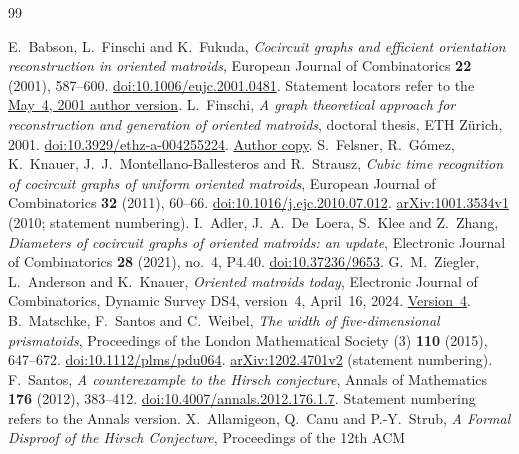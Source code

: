 \documentclass[11pt]{article}
\theoremstyle{remark}
\begin{document}
\begin{thebibliography}{99}
\footnotesize\raggedright
\setlength{\baselineskip}{10pt}
\setlength{\itemsep}{0pt}
E.~Babson, L.~Finschi and K.~Fukuda,
\emph{Cocircuit graphs and efficient orientation reconstruction in oriented
matroids}, European Journal of Combinatorics \textbf{22} (2001), 587--600.
\href{https://doi.org/10.1006/eujc.2001.0481}{doi:10.1006/eujc.2001.0481}.
Statement locators refer to the \href{https://finschi.com/math/publ/2001-05-04_Babson-Finschi-Fukuda_Cocircuit-Graphs-Orientation-Reconstruction.pdf}{May~4, 2001 author version}.
L.~Finschi, \emph{A graph theoretical approach for reconstruction and
generation of oriented matroids}, doctoral thesis, ETH Z\"urich, 2001.
\href{https://doi.org/10.3929/ethz-a-004255224}{doi:10.3929/ethz-a-004255224}.
\href{https://finschi.com/math/publ/2001-08-31_Finschi_A-Graph-Theoretical-Approach-for-Reconstruction-and-Generation-of-Oriented-Matroids.pdf}{Author copy}.
S.~Felsner, R.~G\'omez, K.~Knauer, J.~J.~Montellano-Ballesteros and R.~Strausz,
\emph{Cubic time recognition of cocircuit graphs of uniform oriented matroids},
European Journal of Combinatorics \textbf{32} (2011), 60--66.
\href{https://doi.org/10.1016/j.ejc.2010.07.012}{doi:10.1016/j.ejc.2010.07.012}.
\href{https://arxiv.org/abs/1001.3534v1}{arXiv:1001.3534v1} (2010;
statement numbering).
I.~Adler, J.~A.~De~Loera, S.~Klee and Z.~Zhang,
\emph{Diameters of cocircuit graphs of oriented matroids: an update},
Electronic Journal of Combinatorics \textbf{28} (2021), no.~4, P4.40.
\href{https://doi.org/10.37236/9653}{doi:10.37236/9653}.
G.~M.~Ziegler, L.~Anderson and K.~Knauer,
\emph{Oriented matroids today}, Electronic Journal of Combinatorics,
Dynamic Survey DS4, version~4, April~16, 2024.
\href{https://www.combinatorics.org/files/Surveys/ds4/ds4v4-2024.pdf}{Version~4}.
B.~Matschke, F.~Santos and C.~Weibel,
\emph{The width of five-dimensional prismatoids}, Proceedings of the London
Mathematical Society (3) \textbf{110} (2015), 647--672.
\href{https://doi.org/10.1112/plms/pdu064}{doi:10.1112/plms/pdu064}.
\href{https://arxiv.org/abs/1202.4701v2}{arXiv:1202.4701v2}
(statement numbering).
F.~Santos, \emph{A counterexample to the Hirsch conjecture},
Annals of Mathematics \textbf{176} (2012), 383--412.
\href{https://doi.org/10.4007/annals.2012.176.1.7}{doi:10.4007/annals.2012.176.1.7}.
Statement numbering refers to the Annals version.
X.~Allamigeon, Q.~Canu and P.-Y.~Strub,
\emph{A Formal Disproof of the Hirsch Conjecture}, Proceedings of the 12th ACM

\end{thebibliography}
\end{document}
